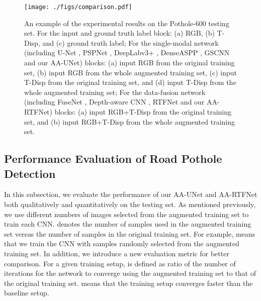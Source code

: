 \documentclass[runningheads]{llncs}
\begin{document}
\begin{figure}[!htbp]
	\centering
	\texttt{[image: ./figs/comparison.pdf]}
	\caption{An example of the experimental results on the Pothole-600 testing set. For the input and ground truth label block: (a) RGB, (b) T-Disp, and (c) ground truth label; For the single-modal network (including U-Net \cite{ronneberger2015u}, PSPNet \cite{zhao2017pyramid}, DeepLabv3+ \cite{chen2018encoder}, DenseASPP \cite{yang2018denseaspp}, GSCNN \cite{takikawa2019gated} and our AA-UNet) blocks: (a) input RGB from the original training set, (b) input RGB from the whole augmented training set, (c) input T-Disp from the original training set, and (d) input T-Disp from the whole augmented training set; For the data-fusion network (including FuseNet \cite{hazirbas2016fusenet}, Depth-aware CNN \cite{wang2018depth}, RTFNet \cite{sun2019rtfnet} and our AA-RTFNet) blocks: (a) input RGB+T-Disp from the original training set, and (b) input RGB+T-Disp from the whole augmented training set.}
	\label{fig.comparison}
\end{figure}

\subsection{Performance Evaluation of Road Pothole Detection}
\label{sec.performance_evaluation}
In this subsection, we evaluate the performance of our AA-UNet and AA-RTFNet both qualitatively and quantitatively on the testing set. As mentioned previously, we use different numbers of images selected from the augmented training set to train each CNN.   denotes the number of samples used in the augmented training set versus the number of samples in the original training set. For example,  means that we train the CNN with  samples randomly selected from the augmented training set. In addition, we introduce a new evaluation metric  for better comparison. For a given training setup,  is defined as ratio of the number of iterations for the network to converge using the augmented training set to that of the original training set.  means that the training setup converges faster than the baseline setup.
\end{document}
